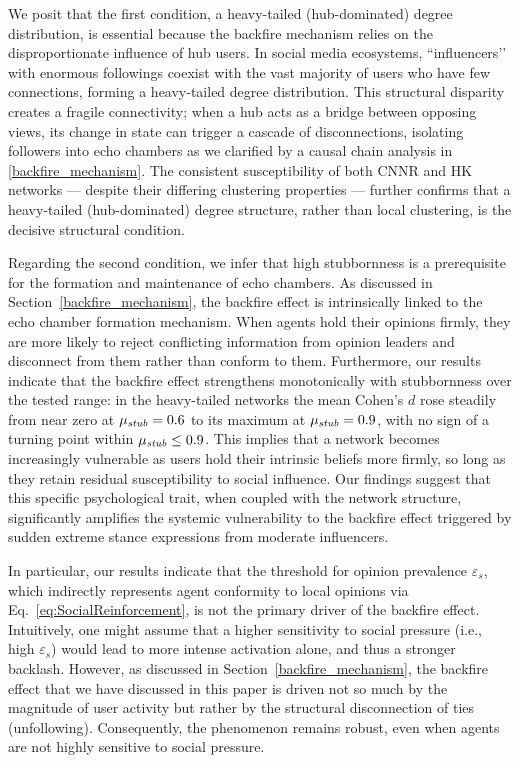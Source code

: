 \documentclass[pdflatex,sn-mathphys-num]{sn-jnl}%
\theoremstyle{thmstyleone}%
\theoremstyle{thmstyletwo}%
\theoremstyle{thmstylethree}%
\def\Stubbornness{\mu_{\it stub}}
\def\ThofOpPreval{\varepsilon_s}
\begin{document}
We posit that the first condition, 
a heavy-tailed (hub-dominated) degree distribution, 
is essential because the backfire mechanism relies 
on the disproportionate influence of hub users. 
In social media ecosystems, ``influencers’’ with 
enormous followings coexist with the vast majority 
of users who have few connections, forming a 
heavy-tailed degree distribution. This structural 
disparity creates a fragile connectivity; 
when a hub acts as a bridge between opposing views, 
its change in state can trigger a cascade of 
disconnections, isolating followers into echo chambers as
we clarified by a causal chain analysis in \ref{backfire_mechanism}. 
The consistent susceptibility of both CNNR and HK networks 
--- despite their differing clustering properties --- 
further confirms that a heavy-tailed (hub-dominated) 
degree structure, rather than local clustering, is the decisive structural condition.
\par

Regarding the second condition, we infer that
high stubbornness is a prerequisite for the
formation and maintenance of echo chambers. 
As discussed in Section~\ref{backfire_mechanism}, 
the backfire effect is intrinsically linked 
to the echo chamber formation mechanism. 
When agents hold their opinions firmly, 
they are more likely to reject conflicting information 
from opinion leaders and disconnect from them 
rather than conform to them. Furthermore, our results
indicate that the backfire effect strengthens monotonically
with stubbornness over the tested range: 
in the heavy-tailed networks the mean Cohen's $d$ 
rose steadily from near zero at $\Stubbornness = 0.6$ to 
its maximum at $\Stubbornness = 0.9$, 
with no sign of a turning point within $\Stubbornness \leq 0.9$. 
This implies that a network becomes increasingly vulnerable 
as users hold their intrinsic beliefs more firmly, 
so long as they retain residual susceptibility to 
social influence. Our findings suggest that this 
specific psychological trait, when coupled with 
the network structure, significantly amplifies the 
systemic vulnerability to the backfire effect triggered 
by sudden extreme stance expressions from moderate influencers.
\par

In particular, our results indicate that the threshold 
for opinion prevalence $\ThofOpPreval$, which indirectly 
represents agent conformity to local opinions via 
Eq.~\eqref{eq:SocialReinforcement}, is not the primary 
driver of the backfire effect. Intuitively, one might 
assume that a higher sensitivity to social pressure 
(i.e., high $\ThofOpPreval$) would lead to more intense 
activation alone, and thus a stronger backlash. 
However, as discussed in Section~\ref{backfire_mechanism}, 
the backfire effect that we have discussed
in this paper is driven not so much by the magnitude
of user activity but rather by the structural 
disconnection of ties (unfollowing). 
Consequently, the phenomenon remains robust, even when 
agents are not highly sensitive to social pressure.
\par
\end{document}
